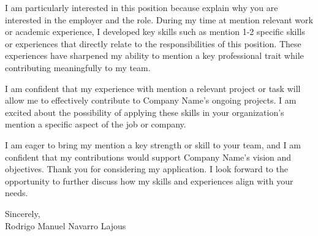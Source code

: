 \documentclass[a4paper,10pt]{article}
\begin{document}
I am particularly interested in this position because {explain why you are interested in the employer and the role}. During my time at {mention relevant work or academic experience}, I developed key skills such as {mention 1-2 specific skills or experiences} that directly relate to the responsibilities of this position. These experiences have sharpened my ability to {mention a key professional trait} while contributing meaningfully to my team.

I am confident that my experience with {mention a relevant project or task} will allow me to effectively contribute to {Company Name}’s ongoing projects. I am excited about the possibility of applying these skills in your organization’s {mention a specific aspect of the job or company}.

\vspace{0.5cm}

I am eager to bring my {mention a key strength or skill} to your team, and I am confident that my contributions would support {Company Name}’s vision and objectives. Thank you for considering my application. I look forward to the opportunity to further discuss how my skills and experiences align with your needs.

\vspace{0.5cm}

Sincerely, \\
Rodrigo Manuel Navarro Lajous
\end{document}
